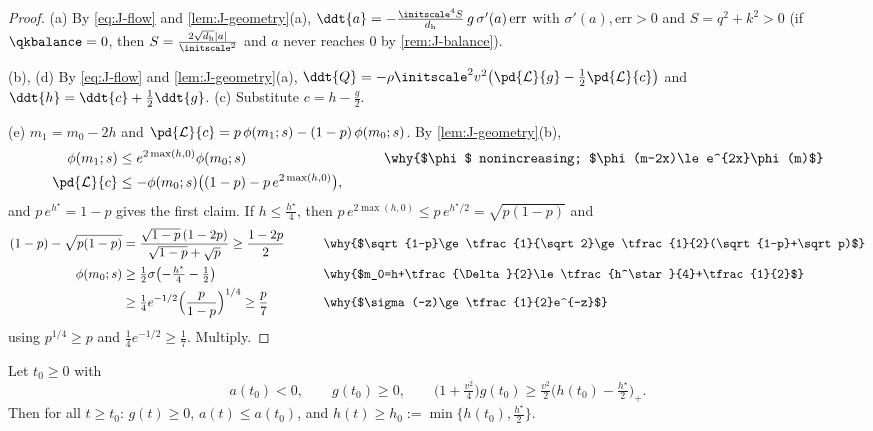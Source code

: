 \begin{proof}
(a) By \cref{eq:J-flow} and \cref{lem:J-geometry}(a), $\ddt{a}=-\frac{\initscale^4S}{d_{\mathrm h}}\,g\,\sigma'(a)\,\mathrm{err}$ with $\sigma'(a),\mathrm{err}>0$ and $S=q^2+k^2>0$ (if $\qkbalance=0$, then $S=\frac{2\sqrt{d_{\mathrm h}}|a|}{\initscale^2}$ and $a$ never reaches $0$ by \cref{rem:J-balance}).

(b), (d) By \cref{eq:J-flow} and \cref{lem:J-geometry}(a), $\ddt{Q}=-\rho\initscale^2v^2\bigl(\pd{\mathcal L}{g}-\frac{1}{2}\pd{\mathcal L}{c}\bigr)$ and
$\ddt{h}=\ddt{c}+\frac{1}{2}\ddt{g}$. (c) Substitute $c=h-\frac{g}{2}$.

(e) $m_1=m_0-2h$ and $\pd{\mathcal L}{c}=p\,\phi(m_1;s)-(1-p)\,\phi(m_0;s)$. By \cref{lem:J-geometry}(b),
\begin{alignat*}{2}
 \phi(m_1;s)&\le e^{2\max(h,0)}\phi(m_0;s) &\qquad& \why{$\phi$ nonincreasing; $\phi(m-2x)\le e^{2x}\phi(m)$}\\
 \pd{\mathcal L}{c}&\le-\phi(m_0;s)\bigl((1-p)-p\,e^{2\max(h,0)}\bigr),
\end{alignat*}
and $p\,e^{h^\star}=1-p$ gives the first claim. If $h\le\frac{h^\star}{4}$, then $p\,e^{2\max(h,0)}\le p\,e^{h^\star/2}=\sqrt{p(1-p)}$ and
\begin{alignat*}{2}
 (1-p)-\sqrt{p(1-p)}&=\frac{\sqrt{1-p}\,(1-2p)}{\sqrt{1-p}+\sqrt p}\ge\frac{1-2p}{2} &\qquad& \why{$\sqrt{1-p}\ge\tfrac{1}{\sqrt2}\ge\tfrac{1}{2}(\sqrt{1-p}+\sqrt p)$}\\
 \phi(m_0;s)&\ge\tfrac{1}{2}\sigma\bigl(-\tfrac{h^\star}{4}-\tfrac{1}{2}\bigr) && \why{$m_0=h+\tfrac{\Delta}{2}\le\tfrac{h^\star}{4}+\tfrac{1}{2}$}\\
 &\ge\tfrac{1}{4}e^{-1/2}\Bigl(\frac{p}{1-p}\Bigr)^{1/4}\ge\frac{p}{7} && \why{$\sigma(-z)\ge\tfrac{1}{2}e^{-z}$}
\end{alignat*}
using $p^{1/4}\ge p$ and $\frac{1}{4}e^{-1/2}\ge\frac{1}{7}$. Multiply.
\end{proof}

\begin{lemma}
\label{lem:J-align}
Let $t_0\ge0$ with
\[
 a(t_0)<0,\qquad g(t_0)\ge0,\qquad \bigl(1+\tfrac{v^2}{4}\bigr)g(t_0)\ge\tfrac{v^2}{2}\bigl(h(t_0)-\tfrac{h^\star}{2}\bigr)_+ .
\]
Then for all $t\ge t_0$: $g(t)\ge0$, $a(t)\le a(t_0)$, and $h(t)\ge h_0:=\min\{h(t_0),\frac{h^\star}{2}\}$.
\end{lemma}

